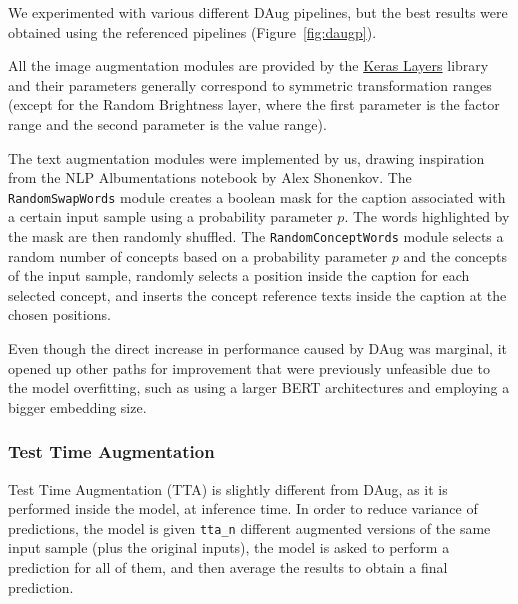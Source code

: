 \documentclass[10pt,twocolumn,letterpaper]{article}
\begin{document}
We experimented with various different DAug pipelines, but the best results were obtained using the referenced pipelines (Figure\ \ref{fig:daugp}).

All the image augmentation modules are provided by the \href{https://www.tensorflow.org/api_docs/python/tf/keras/layers/}{Keras Layers} library and their parameters generally correspond to symmetric transformation ranges (except for the Random Brightness layer, where the first parameter is the factor range and the second parameter is the value range).

The text augmentation modules were implemented by us, drawing inspiration from the NLP Albumentations notebook by Alex Shonenkov\cite{nlp_alb}.
The \texttt{RandomSwapWords} module creates a boolean mask for the caption associated with a certain input sample using a probability parameter $p$.
The words highlighted by the mask are then randomly shuffled.
The \texttt{RandomConceptWords} module selects a random number of concepts based on a probability parameter $p$ and the concepts of the input sample, randomly selects a position inside the caption for each selected concept, and inserts the concept reference texts inside the caption at the chosen positions.

Even though the direct increase in performance caused by DAug was marginal, it opened up other paths for improvement that were previously unfeasible due to the model overfitting, such as using a larger BERT architectures and employing a bigger embedding size.

\subsubsection{Test Time Augmentation}
Test Time Augmentation (TTA) is slightly different from DAug, as it is performed inside the model, at inference time.
In order to reduce variance of predictions, the model is given \texttt{tta\_n} different augmented versions of the same input sample (plus the original inputs), the model is asked to perform a prediction for all of them, and then average the results to obtain a final prediction.
\end{document}
